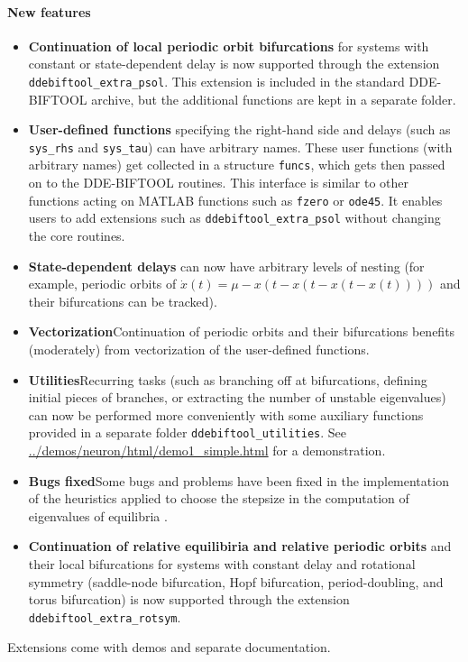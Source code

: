 \documentclass[10pt]{scrartcl}
\newcommand{\DDEBIFCODE}{\textsc{DDE-BIFTOOL}}
\newcommand{\blist}[1]{\mbox{\lstinline!#1!}}
\begin{document}
\paragraph{New features}
\begin{itemize}
\item\label{int:pocont} \textbf{\textsf{Continuation of local periodic orbit
    bifurcations}} for systems with constant or state-dependent delay
  is now supported through the extension \texttt{ddebiftool\_extra\_psol}. This
  extension is included in the standard \DDEBIFCODE{} archive, but the
  additional functions are kept in a separate folder.
\item \textbf{\textsf{User-defined functions}} specifying the right-hand side
  and delays (such as \blist{sys_rhs} and \blist{sys_tau}) can have
  arbitrary names.  These user functions (with arbitrary names) get
  collected in a structure \blist{funcs}, which gets then passed on to
  the \DDEBIFCODE{} routines. This interface is similar to other
  functions acting on MATLAB functions such as \blist{fzero} or
  \blist{ode45}. It enables users to add extensions such as
  \texttt{ddebiftool\_extra\_psol} without changing the core routines.
\item \textbf{\textsf{State-dependent delays}} can now have arbitrary levels of
  nesting (for example, periodic orbits of $\dot
  x(t)=\mu-x(t-x(t-x(t-x(t))))$ and their bifurcations can be
  tracked).
\item \textbf{\textsf{Vectorization}}\quad Continuation of periodic orbits
  and their bifurcations benefits (moderately) from
  vectorization of the user-defined functions.
\item \textbf{\textsf{Utilities}}\quad Recurring tasks (such as branching
  off at bifurcations, defining initial pieces of branches, or
  extracting the number of unstable eigenvalues) can now be performed
  more conveniently with some auxiliary functions provided in a
  separate folder \texttt{ddebiftool\_utilities}. See
  \url{../demos/neuron/html/demo1_simple.html} for a demonstration.
\item \textbf{\textsf{Bugs fixed}}\quad Some bugs and problems have been
  fixed in the implementation of the heuristics applied to choose the
  stepsize in the computation of eigenvalues of equilibria
  \cite{VLR08}.
\item \textbf{\textsf{Continuation of relative equilibiria and
      relative periodic orbits}} and their local bifurcations for
  systems with constant delay and rotational symmetry (saddle-node
  bifurcation, Hopf bifurcation, period-doubling, and torus
  bifurcation) is now supported through the extension
  \texttt{ddebiftool\_extra\_rotsym}.
\end{itemize}
Extensions come with demos and separate documentation.
\end{document}
